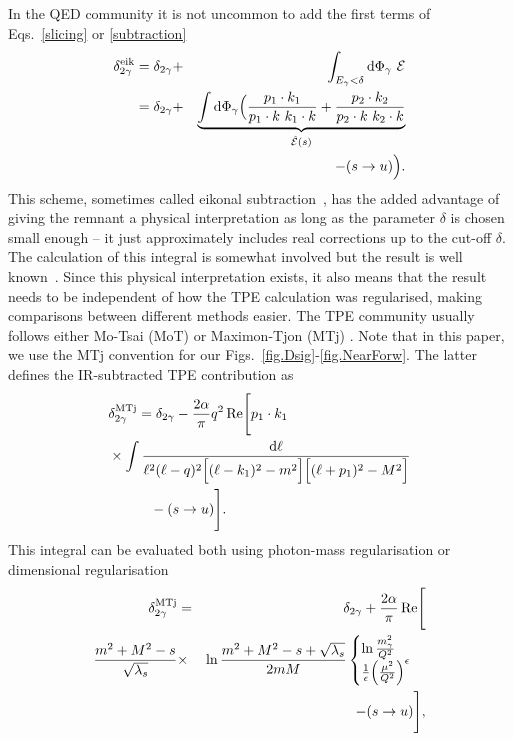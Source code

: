 In the QED community it is not uncommon to add the first terms of Eqs.~\ref{slicing} or \ref{subtraction}
\begin{eqnarray}
    \delta_{2\gamma}^{\rm eik} &= \delta_{2\gamma} +&
          \int_{E_\gamma < \delta} \dd\Phi_\gamma\ \mathcal{E} \nn\\
    & = \delta_{2\gamma} +&
          \underbrace{
              \int \dd\Phi_\gamma\Big(\frac{p_1\cdot k_1}{p_1\cdot k\ k_1\cdot k}+\frac{p_2\cdot k_2}{p_2\cdot k\ k_2\cdot k}}_{\hat{\mathcal{E}}(s)}\nn\\
              &&
         \hspace*{1cm} - (s\rightarrow u)\Big).
\end{eqnarray}
This scheme, sometimes called eikonal subtraction~\cite{Engel:2019nfw}, has the added advantage of giving the remnant a physical interpretation as long as the parameter $\delta$ is chosen small enough -- it just approximately includes real corrections up to the cut-off $\delta$.
The calculation of this integral is somewhat involved but the result is well known~\cite{Engel:2019nfw,Frederix:2009yq,Ulrich:2020phd}.
Since this physical interpretation exists, it also means that the result needs to be independent of how the TPE calculation was regularised, making comparisons between different methods easier.
The TPE community usually follows either Mo-Tsai (MoT) \cite{Mo:1968cg} or Maximon-Tjon (MTj) \cite{Maximon:2000hm}.
Note that in this paper, we use the MTj convention for our Figs.~\ref{fig.Dsig}-\ref{fig.NearForw}. The latter defines the IR-subtracted TPE contribution as
\begin{align}    &\delta_{2\gamma}^{\rm MTj} = \delta_{2\gamma} -
        \frac{2 \alpha}{\pi} q^2 \,{\rm Re}\Bigg[p_1\cdot k_1 \nonumber\\
        &\times\int  \frac{\mathrm{d} \ell}{
            \ell^2
            (\ell-q)^2
            \Big[(\ell-k_1)^2-m^2\Big]
            \Big[(\ell+p_1)^2-M^2\Big]
        } \nonumber\\&\qquad\quad - (s\rightarrow u)\Bigg].
\end{align}
This integral can be evaluated both using photon-mass regularisation or dimensional regularisation
    \begin{eqnarray}
    \delta_{2\gamma}^{\rm MTj} &=& \delta_{2\gamma} +
    \frac{2 \alpha}{\pi}\,{\rm Re}\Bigg[\nonumber\\
        \frac{m^2+M^2-s}{\sqrt{\lambda_s}}
        & \times&\ln\frac{m^2+M^2-s + \sqrt{\lambda_s}}{2mM}
    \begin{cases} \ln\frac{m_\gamma^2}{Q^2} \\ \frac1{\epsilon}\Big(\frac{\mu^2}{Q^2}\Big)^\epsilon \end{cases}\nonumber\\
    &
    &- (s\rightarrow u)\Bigg],
\end{eqnarray}

